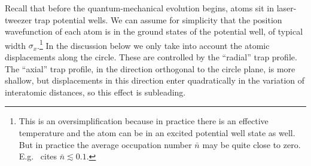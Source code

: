 \documentclass[a4paper,11pt]{article}
\theoremstyle{remark}
\theoremstyle{theorem}
\begin{document}
Recall that before the quantum-mechanical evolution begins, atoms sit in laser-tweezer trap potential wells. We can assume for simplicity that the position wavefunction of each atom is in the ground states of the potential well, of typical width $\sigma_x$.\footnote{This is an oversimplification because in practice there is an effective temperature and the atom can be in an excited potential well state as well. But in practice the average occupation number $\bar n$ may be quite close to zero. E.g.~\cite{Fang:2024uyf} cites $\bar n\lesssim 0.1$.} In the discussion below we only take into account the atomic displacements along the circle. These are controlled by the ``radial'' trap profile. The ``axial'' trap profile, in the direction orthogonal to the circle plane, is more shallow, but displacements in this direction enter quadratically in the variation of interatomic distances, so this effect is subleading. 
\end{document}
